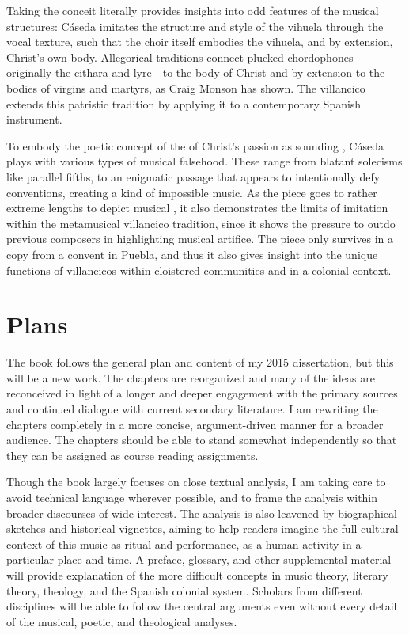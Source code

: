 \documentclass{vcbook-proposal}
\begin{document}
Taking the conceit literally provides insights into odd features of the musical 
structures: Cáseda imitates the structure and style of the vihuela through the 
vocal texture, such that the choir itself embodies the vihuela, and by 
extension, Christ's own body.
Allegorical traditions connect plucked chordophones---originally the cithara 
and lyre---to the body of Christ and by extension to the bodies of virgins and 
martyrs, as Craig Monson has shown.%
  \Autocite{Monson:DivasConvent}
The villancico extends this patristic tradition by applying it to a 
contemporary Spanish instrument.

To embody the poetic concept of the  of Christ's passion as 
sounding , Cáseda plays with various types of musical falsehood.
These range from blatant solecisms like parallel fifths, to an enigmatic passage
that appears to intentionally defy  conventions, creating a
kind of impossible music.
As the piece goes to rather extreme lengths to depict musical 
, it also demonstrates the limits of imitation within the 
metamusical villancico tradition, since it shows the pressure to outdo previous 
composers in highlighting musical artifice.
The piece only survives in a copy from a convent in Puebla, and thus it also 
gives insight into the unique functions of villancicos within cloistered 
communities and in a colonial context.

\section{Plans}

The book follows the general plan and content of my 2015 dissertation, but this 
will be a new work.%
    \Autocite{Cashner:PhD}
The chapters are reorganized and many of the ideas are reconceived in light of a
longer and deeper engagement with the primary sources and continued dialogue
with current secondary literature.
I am rewriting the chapters completely in a more concise, argument-driven manner
for a broader audience.
The chapters should be able to stand somewhat independently so that they can be
assigned as course reading assignments.

Though the book largely focuses on close textual analysis, I am taking care to
avoid technical language wherever possible, and to frame the analysis within
broader discourses of wide interest.
The analysis is also leavened by biographical sketches and historical vignettes,
aiming to help readers imagine the full cultural context of this
music as ritual and performance, as a human activity in a particular place and
time.
A preface, glossary, and other supplemental material will provide explanation of
the more difficult concepts in music theory, literary theory, theology, and the
Spanish colonial system.
Scholars from different disciplines will be able to follow the central arguments
even without every detail of the musical, poetic, and theological analyses.
\end{document}
